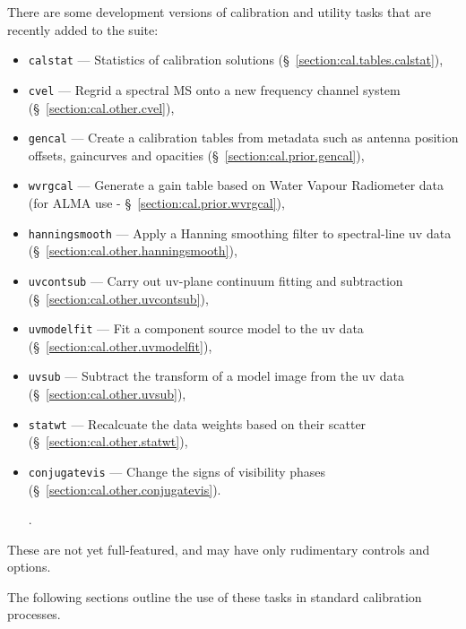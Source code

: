 There are some development versions of calibration and utility
tasks that are recently added to the suite:
\begin{itemize}
   \item {\tt calstat} --- Statistics of calibration solutions 
      (\S~\ref{section:cal.tables.calstat}),
   \item {\tt cvel} --- Regrid a spectral MS onto a new frequency
      channel system
      (\S~\ref{section:cal.other.cvel}),
   \item {\tt gencal} --- Create a calibration tables from metadata
     such as antenna position offsets, gaincurves and opacities 
      (\S~\ref{section:cal.prior.gencal}),
   \item {\tt wvrgcal} --- Generate a gain table based on Water Vapour
     Radiometer data (for ALMA use - \S~\ref{section:cal.prior.wvrgcal}),
   \item {\tt hanningsmooth} --- Apply a Hanning smoothing filter to
      spectral-line uv data
      (\S~\ref{section:cal.other.hanningsmooth}),
   \item {\tt uvcontsub} --- Carry out uv-plane continuum fitting and subtraction 
      (\S~\ref{section:cal.other.uvcontsub}),
   \item {\tt uvmodelfit} --- Fit a component source model to
     the uv data (\S~\ref{section:cal.other.uvmodelfit}),
   \item {\tt uvsub} --- Subtract the transform of a model image from
     the uv data (\S~\ref{section:cal.other.uvsub}),
   \item {\tt statwt} --- Recalcuate the data weights based on their
     scatter (\S~\ref{section:cal.other.statwt}),
   \item {\tt conjugatevis} --- Change the signs of visibility phases 
     (\S~\ref{section:cal.other.conjugatevis}).

.  
\end{itemize}
These are not yet full-featured, and may have only rudimentary
controls and options.

The following sections outline the use of these tasks in standard calibration
processes.

